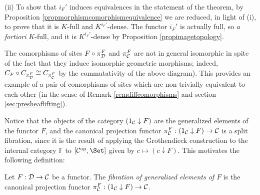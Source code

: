 \documentclass[a4paper,12pt]{article}
\begin{document}
\begin{proofs}
	(ii) To show that $i_{F}'$ induces equivalences in the statement of the theorem, by Proposition \ref{propmorphismcomorphismequivalence} we are reduced, in light of (i), to prove that it is $K$-full and $K^{i_{F}'}$-dense. The functor $i_{F}'$ is actually full, so \emph{a fortiori} $K$-full, and it is $K^{i_{F}'}$-dense by Proposition \ref{propimagetopology}.  	
\end{proofs}

\begin{remark}
	The comorphisms of sites $F\circ \pi_{\cal D}^{F}$ and $\pi_{\cal C}^{F}$ are not in general isomorphic in spite of the fact that they induce isomorphic geometric morphisms; indeed, $C_{F}\circ C_{\pi_{\cal D}^{F}}\cong C_{\pi_{\cal C}^{F}}$ by the commutativity of the above diagram). This provides an example of a pair of comorphisms of sites which are non-trivially equivalent to each other (in the sense of Remark \ref{remdiffcomorphisms} and section \ref{sec:presheaflifting}).   
\end{remark}

Notice that the objects of the category $(1_{\cal C}\downarrow F)$ are the generalized elements of the functor $F$, and the canonical projection functor ${\pi_{\cal C}^{F}}:(1_{\cal C}\downarrow F) \to {\cal C}$ is a split fibration, since it is the result of applying the Grothendieck construction to the internal category $\mathbb F$ to $[{\cal C}^{\textup{op}}, \Set]$ given by $c\mapsto (c\downarrow F)$. This motivates the following definition:

\begin{definition}
	Let $F:{\cal D}\to {\cal C}$ be a functor. The \emph{fibration of generalized elements of $F$} is the canonical projection functor ${\pi_{\cal C}^{F}}:(1_{\cal C}\downarrow F) \to {\cal C}$. 
\end{definition}
\end{document}
